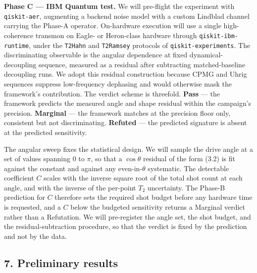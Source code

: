 \documentclass[
  11pt,
]{article}
\begin{document}
\textbf{Phase C --- IBM Quantum test.} We will pre-flight the experiment
with \texttt{qiskit-aer}, augmenting a backend noise model with a custom
Lindblad channel carrying the Phase-A operator. On-hardware execution
will use a single high-coherence transmon on Eagle- or Heron-class
hardware through \texttt{qiskit-ibm-runtime}, under the \texttt{T2Hahn}
and \texttt{T2Ramsey} protocols of \texttt{qiskit-experiments}. The
discriminating observable is the angular dependence at fixed
dynamical-decoupling sequence, measured as a residual after subtracting
matched-baseline decoupling runs. We adopt this residual construction
because CPMG and Uhrig sequences suppress low-frequency dephasing and
would otherwise mask the framework's contribution. The verdict scheme is
threefold. \textbf{Pass} --- the framework predicts the measured angle
and shape residual within the campaign's precision. \textbf{Marginal}
--- the framework matches at the precision floor only, consistent but
not discriminating. \textbf{Refuted} --- the predicted signature is
absent at the predicted sensitivity.

The angular sweep fixes the statistical design. We will sample the drive
angle at a set of values spanning \(0\) to \(\pi\), so that a
\(\cos\theta\) residual of the form (3.2) is fit against the constant
and against any even-in-\(\theta\) systematic. The detectable
coefficient \(C\) scales with the inverse square root of the total shot
count at each angle, and with the inverse of the per-point \(T_2\)
uncertainty. The Phase-B prediction for \(C\) therefore sets the
required shot budget before any hardware time is requested, and a \(C\)
below the budgeted sensitivity returns a Marginal verdict rather than a
Refutation. We will pre-register the angle set, the shot budget, and the
residual-subtraction procedure, so that the verdict is fixed by the
prediction and not by the data.

\hypertarget{preliminary-results}{%
\subsection{7. Preliminary results}\label{preliminary-results}}
\end{document}
